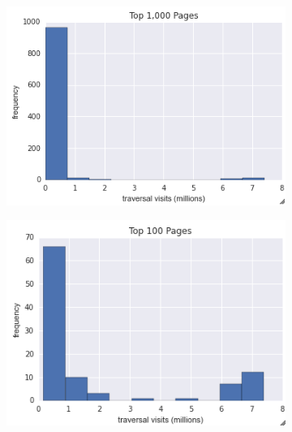 \documentclass[twoside]{article}
\begin{document}
\begin{figure}[H]
\centering
\caption{distribution of traversals}
    \begin{subfigure}[b]{0.4\textwidth}
        \includegraphics[width=\textwidth]{graphics/top_1k_pages.png}
    \end{subfigure}
    \begin{subfigure}[b]{0.4\textwidth}
        \includegraphics[width=\textwidth]{graphics/top_100_pages.png}
    \end{subfigure}
\end{figure}
\end{document}
